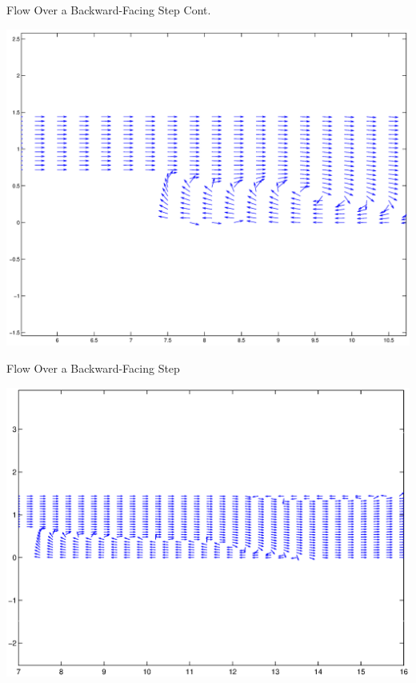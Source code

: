 \documentclass[frames]{prosper}
\begin{document}
\begin{slide}[Dissolve]{Flow Over a Backward-Facing Step Cont.}
\begin{center}
\includegraphics[scale = .3]{backstep_velocityfield_t10}
\end{center}
\end{slide}


\begin{slide}[Dissolve]{Flow Over a Backward-Facing Step}
\begin{center}
\includegraphics[scale = .4]{backstep_velocityfieldfinal}
\end{center}
\end{slide}
\end{document}
